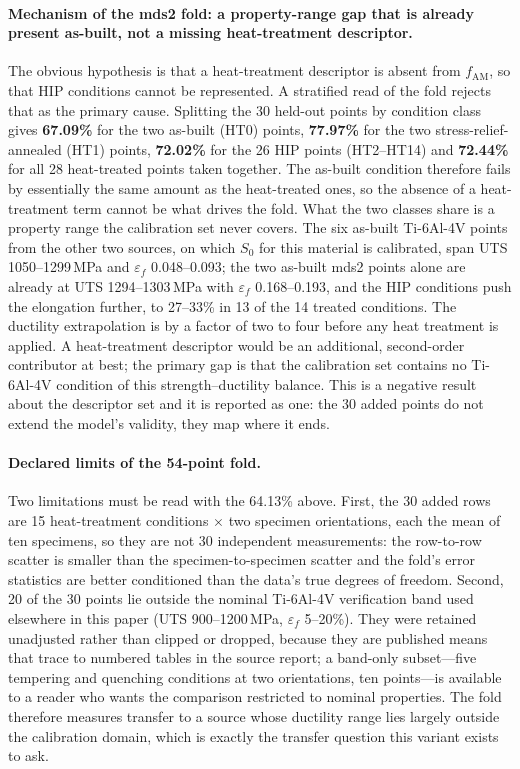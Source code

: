 \documentclass[12pt,a4paper,twocolumn]{article}
\begin{document}
\paragraph{Mechanism of the mds2 fold: a property-range gap that is already present as-built, not a missing heat-treatment descriptor.} The obvious hypothesis is that a heat-treatment descriptor is absent from $f_{\mathrm{AM}}$, so that HIP conditions cannot be represented. A stratified read of the fold rejects that as the primary cause. Splitting the 30 held-out points by condition class gives \textbf{67.09\%} for the two as-built (HT0) points, \textbf{77.97\%} for the two stress-relief-annealed (HT1) points, \textbf{72.02\%} for the 26 HIP points (HT2--HT14) and \textbf{72.44\%} for all 28 heat-treated points taken together. The as-built condition therefore fails by essentially the same amount as the heat-treated ones, so the absence of a heat-treatment term cannot be what drives the fold. What the two classes share is a property range the calibration set never covers. The six as-built Ti-6Al-4V points from the other two sources, on which $S_0$ for this material is calibrated, span UTS 1050--1299\,MPa and $\varepsilon_f$ 0.048--0.093; the two as-built mds2 points alone are already at UTS 1294--1303\,MPa with $\varepsilon_f$ 0.168--0.193, and the HIP conditions push the elongation further, to 27--33\% in 13 of the 14 treated conditions. The ductility extrapolation is by a factor of two to four before any heat treatment is applied. A heat-treatment descriptor would be an additional, second-order contributor at best; the primary gap is that the calibration set contains no Ti-6Al-4V condition of this strength--ductility balance. This is a negative result about the descriptor set and it is reported as one: the 30 added points do not extend the model's validity, they map where it ends.

\paragraph{Declared limits of the 54-point fold.} Two limitations must be read with the 64.13\% above. First, the 30 added rows are 15 heat-treatment conditions $\times$ two specimen orientations, each the mean of ten specimens, so they are not 30 independent measurements: the row-to-row scatter is smaller than the specimen-to-specimen scatter and the fold's error statistics are better conditioned than the data's true degrees of freedom. Second, 20 of the 30 points lie outside the nominal Ti-6Al-4V verification band used elsewhere in this paper (UTS 900--1200\,MPa, $\varepsilon_f$ 5--20\%). They were retained unadjusted rather than clipped or dropped, because they are published means that trace to numbered tables in the source report; a band-only subset---five tempering and quenching conditions at two orientations, ten points---is available to a reader who wants the comparison restricted to nominal properties. The fold therefore measures transfer to a source whose ductility range lies largely outside the calibration domain, which is exactly the transfer question this variant exists to ask.
\end{document}
